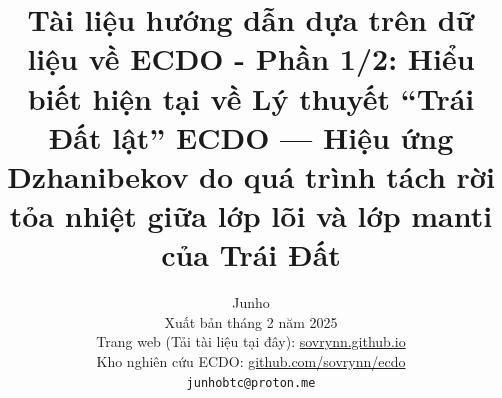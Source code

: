 \documentclass[10pt,twocolumn,letterpaper]{article}
\begin{document}
\title{Tài liệu hướng dẫn dựa trên dữ liệu về ECDO - Phần 1/2: Hiểu biết hiện tại về Lý thuyết “Trái Đất lật” ECDO — Hiệu ứng Dzhanibekov do quá trình tách rời tỏa nhiệt giữa lớp lõi và lớp manti của Trái Đất}

\author{Junho\\
Xuất bản tháng 2 năm 2025\\
Trang web (Tải tài liệu tại đây): \href{https://sovrynn.github.io}{sovrynn.github.io}\\
Kho nghiên cứu ECDO: \href{https://github.com/sovrynn/ecdo}{github.com/sovrynn/ecdo}\\
{\tt\small junhobtc@proton.me}
}

\maketitle
\end{document}
